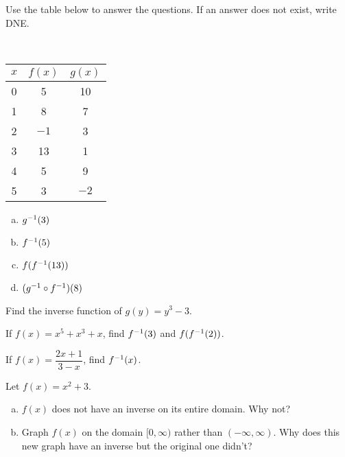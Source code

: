 \documentclass[notes]{subfiles}
\begin{document}
		\begin{ex}
			Use the table below to answer the questions.  If an answer does not exist, write DNE.
		\end{ex}\\
		\begin{minipage}{.3\textwidth}
			\begin{center}
				\begin{tabular}{|c|c|c|}\hline
					\(x\)	& \(f(x)\)& \(g(x)\)\\ \hline
					0	& 5		& 10\\ \hline
					1	& 8		& 7\\ \hline
					2	& \(-1\)	& 3 \\ \hline
					3	& 13		& 1\\ \hline
					4	& 5		& 9\\ \hline
					5	& 3		& \(-2\)\\ \hline
				\end{tabular}
			\end{center}
		\end{minipage}
		\begin{minipage}{.6\textwidth}
			\begin{multicols*}{2}
			\begin{enumerate}[(a)]
				\setlength\itemsep{60pt}
				\item \(g^{-1}(3)\)
				\item \(f^{-1}(5)\)
					\columnbreak
				\item \(f(f^{-1}(13))\)
				\item \((g^{-1}\circ f^{-1})(8)\)
			\end{enumerate}
			\end{multicols*}
		\end{minipage}
		\newpage
		
			
		\begin{ex}
			Find the inverse function of \(g(y) = y^3 - 3\).
		\end{ex}

		\begin{ex}
			If \(f(x) = x^5 + x^3 + x\), find \(f^{-1}(3)\) and \(f(f^{-1}(2))\).
		\end{ex}
			
		\begin{ex}
			If \(f(x) = \dfrac{2x+1}{3-x}\), find \(f^{-1}(x)\).
		\end{ex}
			\newpage
			
		\begin{ex}
			Let \(f(x) = x^2 + 3\).
			\begin{enumerate}[(a)]
				\item \(f(x)\) does not have an inverse on its entire domain. Why not?
					
				\item Graph \(f(x)\) on the domain \([0,\infty)\) rather than \((-\infty,\infty)\). Why does this new graph have an inverse but the original one didn't?
			\end{enumerate}
		\end{ex}
		
\end{document}
